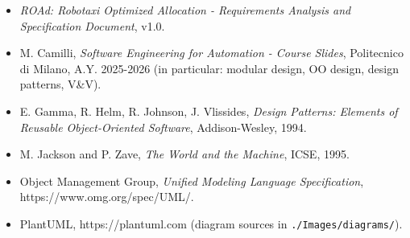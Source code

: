\documentclass[11pt,a4paper,oneside]{report}
\newcommand{\code}[1]{\texttt{#1}}
\providecommand{\tightlist}{\setlength{\itemsep}{0pt}\setlength{\parskip}{0pt}}
\begin{document}
\begin{itemize}
\tightlist
\item
  \emph{ROAd: Robotaxi Optimized Allocation - Requirements Analysis
  and Specification Document}, v1.0.
\item
  M. Camilli, \emph{Software Engineering for Automation - Course
  Slides}, Politecnico di Milano, A.Y. 2025-2026 (in particular: modular
  design, OO design, design patterns, V\&V).
\item
  E. Gamma, R. Helm, R. Johnson, J. Vlissides, \emph{Design Patterns:
  Elements of Reusable Object-Oriented Software}, Addison-Wesley, 1994.
\item
  M. Jackson and P. Zave, \emph{The World and the Machine}, ICSE, 1995.
\item
  Object Management Group, \emph{Unified Modeling Language
  Specification}, https://www.omg.org/spec/UML/.
\item
  PlantUML, https://plantuml.com (diagram sources in
  \code{./Images/diagrams/}).
\end{itemize}
\end{document}
